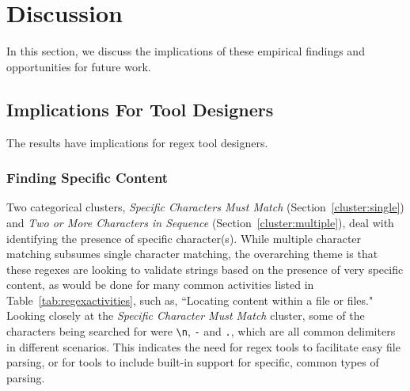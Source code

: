 \section{Discussion}
\label{sec:discussion}

In this section, we discuss the implications of these empirical findings
 and opportunities for future work.

\subsection{Implications For Tool Designers}
The results have  implications for regex tool designers. %



\subsubsection{Finding Specific Content}
Two categorical clusters, \emph{Specific Characters Must Match} (Section~\ref{cluster:single}) and \emph{Two or More Characters in Sequence} (Section~\ref{cluster:multiple}), deal with identifying the presence of specific character(s).
While multiple character matching subsumes single character matching, the overarching theme is that these regexes are looking to validate strings based on the presence of very specific content, as would be done for many common activities listed in Table~\ref{tab:regexactivities}, such as, ``Locating content within a file or files."
Looking closely at the \emph{Specific Character Must Match} cluster, some of the characters being searched for were \verb!\n!, \verb!-! and \verb!.!, which are all common delimiters in different scenarios. This indicates the need for regex tools to facilitate easy file parsing, or for tools to include built-in support for specific, common types of parsing.


